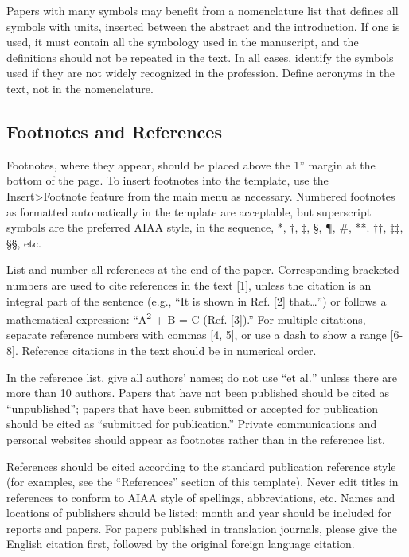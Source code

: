 \documentclass[
]{article}
\begin{document}
Papers with many symbols may benefit from a nomenclature list that
defines all symbols with units, inserted between the abstract and the
introduction. If one is used, it must contain all the symbology used in
the manuscript, and the definitions should not be repeated in the text.
In all cases, identify the symbols used if they are not widely
recognized in the profession. Define acronyms in the text, not in the
nomenclature.

\subsection{Footnotes and References}\label{footnotes-and-references}

Footnotes, where they appear, should be placed above the 1'' margin at
the bottom of the page. To insert footnotes into the template, use the
Insert\textgreater Footnote feature from the main menu as necessary.
Numbered footnotes as formatted automatically in the template are
acceptable, but superscript symbols are the preferred AIAA style, in the
sequence, *, †, ‡, §, ¶, \#, **. ††, ‡‡, §§, etc.

List and number all references at the end of the paper. Corresponding
bracketed numbers are used to cite references in the text {[}1{]},
unless the citation is an integral part of the sentence (e.g., ``It is
shown in Ref. {[}2{]} that\ldots'') or follows a mathematical
expression: ``A\textsuperscript{2} + B = C (Ref. {[}3{]}).'' For
multiple citations, separate reference numbers with commas {[}4, 5{]},
or use a dash to show a range {[}6-8{]}. Reference citations in the text
should be in numerical order.

In the reference list, give all authors' names; do not use ``et
al\emph{.}'' unless there are more than 10 authors. Papers that have not
been published should be cited as ``unpublished''; papers that have been
submitted or accepted for publication should be cited as ``submitted for
publication.'' Private communications and personal websites should
appear as footnotes rather than in the reference list.

References should be cited according to the standard publication
reference style (for examples, see the ``References'' section of this
template). Never edit titles in references to conform to AIAA style of
spellings, abbreviations, etc. Names and locations of publishers should
be listed; month and year should be included for reports and papers. For
papers published in translation journals, please give the English
citation first, followed by the original foreign language citation.
\end{document}
